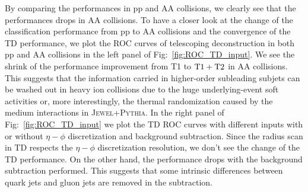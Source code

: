 \documentclass[notoc]{JHEP3}
\newcommand{\jwpy}{\textsc{Jewel+Pythia}}
\begin{document}
By comparing the performances in pp and AA collisions, we clearly see that the performances drops in AA collisions. To have a closer look at the change of the classification performance from pp to AA collisions and the convergence of the TD performance, we plot the ROC curves of telescoping deconstruction in both pp and AA collisions in the left panel of Fig:~\ref{fig:ROC_TD_input}. We see the shrink of the performance improvement from T1 to $\rm T1+T2$ in AA collisions. This suggests that the information carried in higher-order subleading subjets can be washed out in heavy ion collisions due to the huge underlying-event soft activities or, more interestingly, the thermal randomization caused by the medium interactions in \jwpy. In the right panel of Fig:~\ref{fig:ROC_TD_input} we plot the TD ROC curves with different inputs with or without $\eta-\phi$ discretization and background subtraction. Since the radius scan in TD respects the $\eta-\phi$ discretization resolution, we don't see the change of the TD performance. On the other hand, the performance drops with the background subtraction performed. This suggests that some intrinsic differences between quark jets and gluon jets are removed in the subtraction. 
\end{document}
